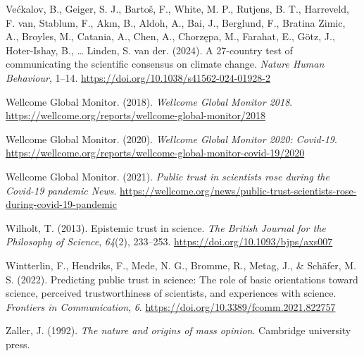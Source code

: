 \documentclass[
  jou,
  floatsintext,
  longtable,
  nolmodern,
  notxfonts,
  notimes,
  colorlinks=true,linkcolor=blue,citecolor=blue,urlcolor=blue]{apa7}
\newlength{\cslhangindent}
\newenvironment{CSLReferences}[2] %
 {\begin{list}{}{%
  \setlength{\itemindent}{0pt}
  \setlength{\leftmargin}{0pt}
  \setlength{\parsep}{0pt}
  \ifodd #1
   \setlength{\leftmargin}{\cslhangindent}
   \setlength{\itemindent}{-1\cslhangindent}
  \fi
  \setlength{\itemsep}{#2\baselineskip}}}
 {\end{list}}
\begin{document}
\begin{CSLReferences}{1}{0}
Većkalov, B., Geiger, S. J., Bartoš, F., White, M. P., Rutjens, B. T.,
Harreveld, F. van, Stablum, F., Akın, B., Aldoh, A., Bai, J., Berglund,
F., Bratina Zimic, A., Broyles, M., Catania, A., Chen, A., Chorzępa, M.,
Farahat, E., Götz, J., Hoter-Ishay, B., \ldots{} Linden, S. van der.
(2024). A 27-country test of communicating the scientific consensus on
climate change. \emph{Nature Human Behaviour}, 1--14.
\url{https://doi.org/10.1038/s41562-024-01928-2}

Wellcome Global Monitor. (2018). \emph{Wellcome Global Monitor 2018}.
\url{https://wellcome.org/reports/wellcome-global-monitor/2018}

Wellcome Global Monitor. (2020). \emph{Wellcome Global Monitor 2020:
Covid-19}.
\url{https://wellcome.org/reports/wellcome-global-monitor-covid-19/2020}

Wellcome Global Monitor. (2021). \emph{Public trust in scientists rose
during the Covid-19 pandemic \textbar{} News}.
\url{https://wellcome.org/news/public-trust-scientists-rose-during-covid-19-pandemic}

Wilholt, T. (2013). Epistemic trust in science. \emph{The British
Journal for the Philosophy of Science}, \emph{64}(2), 233--253.
\url{https://doi.org/10.1093/bjps/axs007}

Wintterlin, F., Hendriks, F., Mede, N. G., Bromme, R., Metag, J., \&
Schäfer, M. S. (2022). Predicting public trust in science: The role of
basic orientations toward science, perceived trustworthiness of
scientists, and experiences with science. \emph{Frontiers in
Communication}, \emph{6}.
\url{https://doi.org/10.3389/fcomm.2021.822757}

Zaller, J. (1992). \emph{The nature and origins of mass opinion}.
Cambridge university press.

\end{CSLReferences}
\end{document}
